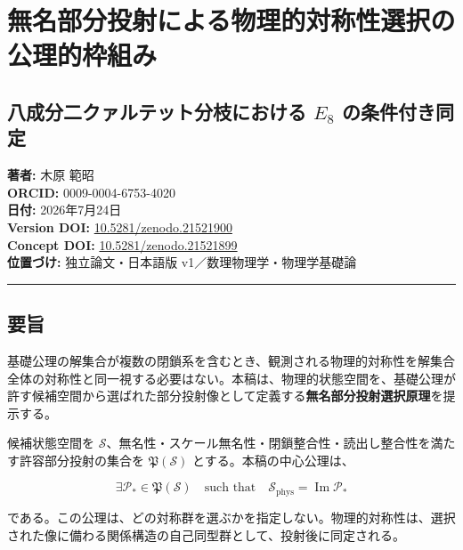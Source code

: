 \documentclass[
  a4paper,
  ja=minimal,
  xelatex,
  paragraph-mark={},
]{bxjsarticle}
\author{}
\date{}
\begin{document}
\section{無名部分投射による物理的対称性選択の公理的枠組み}\label{ux7121ux540dux90e8ux5206ux6295ux5c04ux306bux3088ux308bux7269ux7406ux7684ux5bfeux79f0ux6027ux9078ux629eux306eux516cux7406ux7684ux67a0ux7d44ux307f}

\subsection{\texorpdfstring{八成分二クァルテット分枝における \(E_8\)
の条件付き同定}{八成分二クァルテット分枝における E\_8 の条件付き同定}}\label{ux516bux6210ux5206ux4e8cux30afux30a1ux30ebux30c6ux30c3ux30c8ux5206ux679dux306bux304aux3051ux308b-e_8-ux306eux6761ux4ef6ux4ed8ux304dux540cux5b9a}

\textbf{著者:} 木原 範昭\\
\textbf{ORCID:} 0009-0004-6753-4020\\
\textbf{日付:} 2026年7月24日\\
\textbf{Version DOI:}
\href{https://doi.org/10.5281/zenodo.21521900}{10.5281/zenodo.21521900}\\
\textbf{Concept DOI:}
\href{https://doi.org/10.5281/zenodo.21521899}{10.5281/zenodo.21521899}\\
\textbf{位置づけ:} 独立論文・日本語版 v1／数理物理学・物理学基礎論

\begin{center}\rule{0.5\linewidth}{0.5pt}\end{center}

\subsection{要旨}\label{ux8981ux65e8}

基礎公理の解集合が複数の閉鎖系を含むとき、観測される物理的対称性を解集合全体の対称性と同一視する必要はない。本稿は、物理的状態空間を、基礎公理が許す候補空間から選ばれた部分投射像として定義する\textbf{無名部分投射選択原理}を提示する。

候補状態空間を
\(\mathscr S\)、無名性・スケール無名性・閉鎖整合性・読出し整合性を満たす許容部分投射の集合を
\(\mathfrak P(\mathscr S)\) とする。本稿の中心公理は、

\[
\boxed{
\exists\mathcal P_*\in\mathfrak P(\mathscr S)
\quad\text{such that}\quad
\mathscr S_{\mathrm{phys}}
{}=
\operatorname{Im}\mathcal P_*
}
\]

である。この公理は、どの対称群を選ぶかを指定しない。物理的対称性は、選択された像に備わる関係構造の自己同型群として、投射後に同定される。
\end{document}
